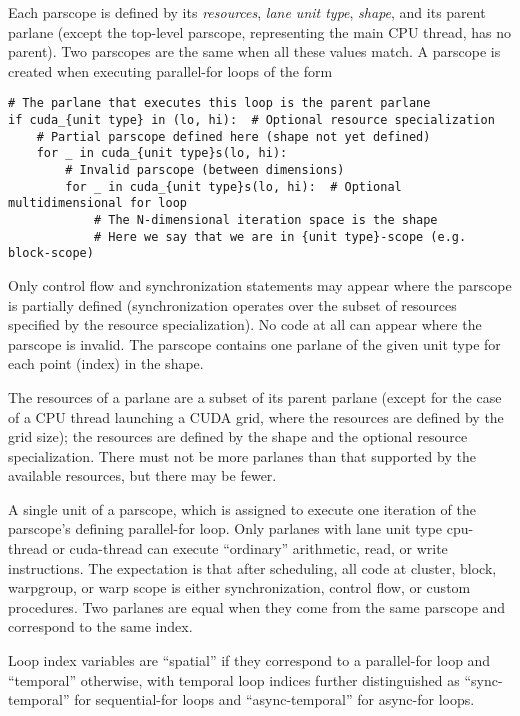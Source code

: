 \filbreak
{} Each parscope is defined by its \textit{resources}, \textit{lane unit type}, \textit{shape}, and its parent parlane (except the top-level parscope, representing the main CPU thread, has no parent). Two parscopes are the same when all these values match. A parscope is created when executing parallel-for loops of the form

{\color{lightttColor}
\begin{verbatim}
# The parlane that executes this loop is the parent parlane
if cuda_{unit type} in (lo, hi):  # Optional resource specialization
    # Partial parscope defined here (shape not yet defined)
    for _ in cuda_{unit type}s(lo, hi):
        # Invalid parscope (between dimensions)
        for _ in cuda_{unit type}s(lo, hi):  # Optional multidimensional for loop
            # The N-dimensional iteration space is the shape
            # Here we say that we are in {unit type}-scope (e.g. block-scope)
\end{verbatim}
}

Only control flow and synchronization statements may appear where the parscope is partially defined (synchronization operates over the subset of resources specified by the resource specialization).
No code at all can appear where the parscope is invalid.
The parscope contains one parlane of the given unit type for each point (index) in the shape.

The resources of a parlane are a subset of its parent parlane (except for the case of a CPU thread launching a CUDA grid, where the resources are defined by the grid size); the resources are defined by the shape and the optional resource specialization.
There must not be more parlanes than that supported by the available resources, but there may be fewer.

\filbreak
{} A single unit of a parscope, which is assigned to execute one iteration of the parscope's defining parallel-for loop.
Only parlanes with lane unit type cpu-thread or cuda-thread can execute ``ordinary'' arithmetic, read, or write instructions. 
The expectation is that after scheduling, all code at cluster, block, warpgroup, or warp scope is either synchronization, control flow, or custom procedures.
Two parlanes are equal when they come from the same parscope and correspond to the same index.

\filbreak
{} Loop index variables are ``spatial'' if they correspond to a parallel-for loop and ``temporal'' otherwise, with temporal loop indices further distinguished as ``sync-temporal'' for sequential-for loops and ``async-temporal'' for async-for loops.

